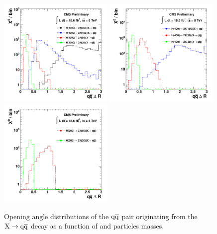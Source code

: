 \begin{figure}[htbp]
\centering
\includegraphics[width=0.49\textwidth]{plots/signal/dRH1000.pdf}
\includegraphics[width=0.49\textwidth]{plots/signal/dRH400.pdf}
\includegraphics[width=0.49\textwidth]{plots/signal/dRH200.pdf}
\caption{Opening angle distributions of the $\mathrm{q}\overline{\mathrm{q}}$ pair originating from the $\mathrm{X}\rightarrow\mathrm{q}\overline{\mathrm{q}}$ decay as a function
of \Higgs and \X particles masses. \label{fig:sigdR}}
\end{figure}

